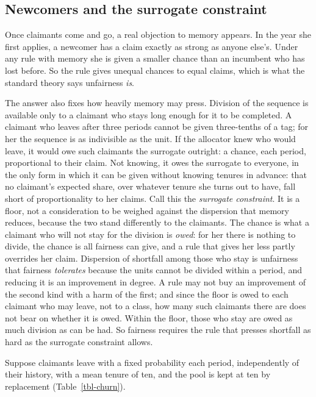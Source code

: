 \documentclass[
  11pt,
  letterpaper,
  DIV=11,
  numbers=noendperiod,
  twoside]{scrartcl}
\begin{document}
\subsection{Newcomers and the surrogate
constraint}\label{newcomers-and-the-surrogate-constraint}

Once claimants come and go, a real objection to memory appears. In the
year she first applies, a newcomer has a claim exactly as strong as
anyone else's. Under any rule with memory she is given a smaller chance
than an incumbent who has lost before. So the rule gives unequal chances
to equal claims, which is what the standard theory says unfairness
\emph{is}.

The answer also fixes how heavily memory may press. Division of the
sequence is available only to a claimant who stays long enough for it to
be completed. A claimant who leaves after three periods cannot be given
three-tenths of a tag; for her the sequence is as indivisible as the
unit. If the allocator knew who would leave, it would owe such claimants
the surrogate outright: a chance, each period, proportional to their
claim. Not knowing, it owes the surrogate to everyone, in the only form
in which it can be given without knowing tenures in advance: that no
claimant's expected share, over whatever tenure she turns out to have,
fall short of proportionality to her claims. Call this the
\emph{surrogate constraint}. It is a floor, not a consideration to be
weighed against the dispersion that memory reduces, because the two
stand differently to the claimants. The chance is what a claimant who
will not stay for the division is \emph{owed}: for her there is nothing
to divide, the chance is all fairness can give, and a rule that gives
her less partly overrides her claim. Dispersion of shortfall among those
who stay is unfairness that fairness \emph{tolerates} because the units
cannot be divided within a period, and reducing it is an improvement in
degree. A rule may not buy an improvement of the second kind with a harm
of the first; and since the floor is owed to each claimant who may
leave, not to a class, how many such claimants there are does not bear
on whether it is owed. Within the floor, those who stay are owed as much
division as can be had. So fairness requires the rule that presses
shortfall as hard as the surrogate constraint allows.

Suppose claimants leave with a fixed probability each period,
independently of their history, with a mean tenure of ten, and the pool
is kept at ten by replacement (Table~\ref{tbl-churn}).
\end{document}
